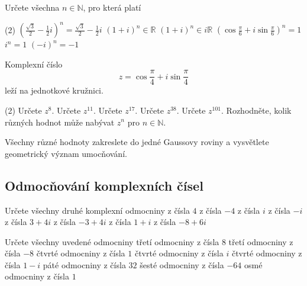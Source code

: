 \begin{exercise}{Určete všechna $n\in\mathbb{N}$, pro která platí}
    \begin{tasks}(2)
        \task $\left(\frac{\sqrt3}{2}-\frac12i\right)^n=
               \frac{\sqrt3}{2}-\frac12i$
        \task $(1+i)^n\in\mathbb{R}$
        \task $(1+i)^n\in i\mathbb{R}$
        \task $\left(\cos\frac{\pi}{6}+i\sin\frac{\pi}{6}\right)^n=1$
        \task $i^n=1$
        \task $(-i)^n=-1$
    \end{tasks}
\end{exercise}


\begin{exercise}{Komplexní číslo
\[
    z=\cos\frac{\pi}{4}+i\sin\frac{\pi}{4}
\]
leží na jednotkové kružnici.}
    \begin{tasks}(2)
        \task Určete $z^8$.
        \task Určete $z^{11}$.
        \task Určete $z^{17}$.
        \task Určete $z^{38}$.
        \task Určete $z^{101}$.
        \task Rozhodněte, kolik různých hodnot může nabývat $z^n$ pro $n\in\mathbb{N}$.
    \end{tasks}

    Všechny různé hodnoty zakreslete do jedné Gaussovy roviny a vysvětlete
    geometrický význam umocňování.
\end{exercise}



\subsection*{Odmocňování komplexních čísel}

\begin{exerciseblock}[2]{Určete všechny druhé komplexní odmocniny}
    \task z čísla $4$
    \task z čísla $-4$
    \task z čísla $i$
    \task z čísla $-i$
    \task z čísla $3+4i$
    \task z čísla $-3+4i$
    \task z čísla $1+i$
    \task z čísla $-8+6i$
\end{exerciseblock}


\begin{exerciseblock}[2]{Určete všechny uvedené odmocniny}
    \task třetí odmocniny z čísla $8$
    \task třetí odmocniny z čísla $-8$
    \task čtvrté odmocniny z čísla $1$
    \task čtvrté odmocniny z čísla $i$
    \task čtvrté odmocniny z čísla $1-i$
    \task páté odmocniny z čísla $32$
    \task šesté odmocniny z čísla $-64$
    \task osmé odmocniny z čísla $1$
\end{exerciseblock}



